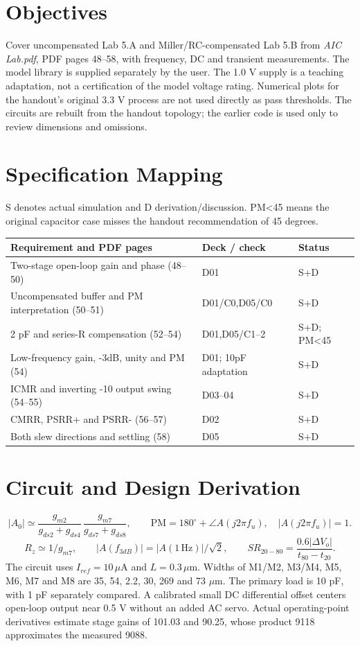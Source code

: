 \section{Objectives}
Cover uncompensated Lab 5.A and Miller/RC-compensated Lab 5.B from \textit{AIC Lab.pdf}, PDF pages 48--58, with frequency, DC and transient measurements. The model library is supplied separately by the user. The 1.0 V supply is a teaching adaptation, not a certification of the model voltage rating. Numerical plots for the handout's original 3.3 V process are not used directly as pass thresholds. The circuits are rebuilt from the handout topology; the earlier code is used only to review dimensions and omissions.

\section{Specification Mapping}
S denotes actual simulation and D derivation/discussion. PM<45 means the original capacitor case misses the handout recommendation of 45 degrees.
\small\begin{longtable}{p{.46\linewidth}p{.30\linewidth}p{.15\linewidth}}\toprule
Requirement and PDF pages & Deck / check & Status \\ \midrule\endhead
Two-stage open-loop gain and phase (48--50) & D01 & S+D \\
Uncompensated buffer and PM interpretation (50--51) & D01/C0,D05/C0 & S+D \\
2 pF and series-R compensation (52--54) & D01,D05/C1--2 & S+D; PM<45 \\
Low-frequency gain, -3dB, unity and PM (54) & D01; 10pF adaptation & S+D \\
ICMR and inverting -10 output swing (54--55) & D03--04 & S+D \\
CMRR, PSRR+ and PSRR- (56--57) & D02 & S+D \\
Both slew directions and settling (58) & D05 & S+D \\
\bottomrule\end{longtable}\normalsize


\section{Circuit and Design Derivation}
\[
 |A_0|\simeq\frac{g_{m2}}{g_{ds2}+g_{ds4}}\,
 \frac{g_{m7}}{g_{ds7}+g_{ds8}},\qquad
 \mathrm{PM}=180^\circ+\angle A(j2\pi f_u),\quad |A(j2\pi f_u)|=1.
 \]
 \[
 R_z\simeq1/g_{m7},\qquad
 |A(f_{3dB})|=|A(1\,\mathrm{Hz})|/\sqrt2,\qquad
 SR_{20-80}=\frac{0.6|\Delta V_o|}{t_{80}-t_{20}}.
 \]The circuit uses $I_{ref}=10\,\mu$A and $L=0.3\,\mu$m. Widths of M1/M2, M3/M4, M5, M6, M7 and M8 are 35, 54, 2.2, 30, 269 and 73 $\mu$m. The primary load is 10 pF, with 1 pF separately compared. A calibrated small DC differential offset centers open-loop output near 0.5 V without an added AC servo. Actual operating-point derivatives estimate stage gains of 101.03 and 90.25, whose product 9118 approximates the measured 9088.

